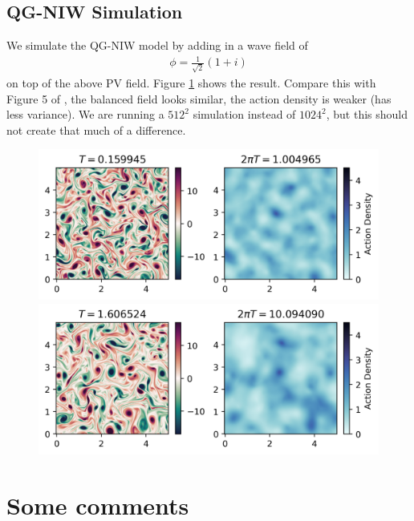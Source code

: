 \subsection{QG-NIW Simulation}
We simulate the QG-NIW model by adding in a wave field of
\begin{align}
    \phi = \frac{1}{\sqrt{2}}(1+i)
\end{align}
on top of the above PV field. Figure \ref{fig:QGNIW_t1} shows the result. Compare this with Figure 5 of \cite{RochaEtAl_18}, the balanced field looks similar, the action density is weaker (has less variance). We are running a $512^2$ simulation instead of $1024^2$, but this should not create that much of a difference. 
\begin{figure}[h]
    \centering
    \includegraphics{QGNIW_t1}
    \includegraphics{QGNIW_t10}
    \caption{}
    \label{fig:QGNIW_t1}
\end{figure}

\section{Some comments}
